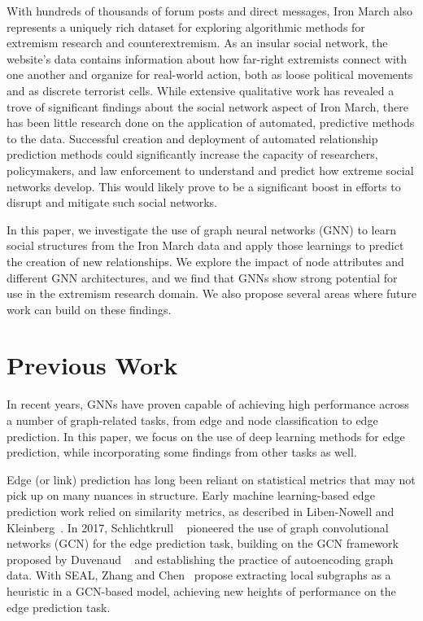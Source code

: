 \documentclass[10pt,twocolumn,letterpaper]{article}
\begin{document}
With hundreds of thousands of forum posts and direct messages, Iron March also represents a uniquely rich dataset for exploring algorithmic methods for extremism research and counterextremism. As an insular social network, the website's data contains information about how far-right extremists connect with one another and organize for real-world action, both as loose political movements and as discrete terrorist cells. While extensive qualitative work has revealed a trove of significant findings about the social network aspect of Iron March, there has been little research done on the application of automated, predictive methods to the data. Successful creation and deployment of automated relationship prediction methods could significantly increase the capacity of researchers, policymakers, and law enforcement to understand and predict how extreme social networks develop. This would likely prove to be a significant boost in efforts to disrupt and mitigate such social networks. 

In this paper, we investigate the use of graph neural networks (GNN) to learn social structures from the Iron March data and apply those learnings to predict the creation of new relationships. We explore the impact of node attributes and different GNN architectures, and we find that GNNs show strong potential for use in the extremism research domain. We also propose several areas where future work can build on these findings.

\section{Previous Work}

In recent years, GNNs have proven capable of achieving high performance across a number of graph-related tasks, from edge and node classification to edge prediction. In this paper, we focus on the use of deep learning methods for edge prediction, while incorporating some findings from other tasks as well.

Edge (or link) prediction has long been reliant on statistical metrics that may not pick up on many nuances in structure. Early machine learning-based edge prediction work relied on similarity metrics, as described in Liben-Nowell and Kleinberg~\cite{linkpred2007}. In 2017, Schlichtkrull \etal~\cite{schlichtkrull2017modeling} pioneered the use of graph convolutional networks (GCN) for the edge prediction task, building on the GCN framework proposed by Duvenaud \etal~\cite{Duvenaud} and establishing the practice of autoencoding graph data. With SEAL, Zhang and Chen~\cite{SEAL} propose extracting local subgraphs as a heuristic in a GCN-based model, achieving new heights of performance on the edge prediction task.
\end{document}
